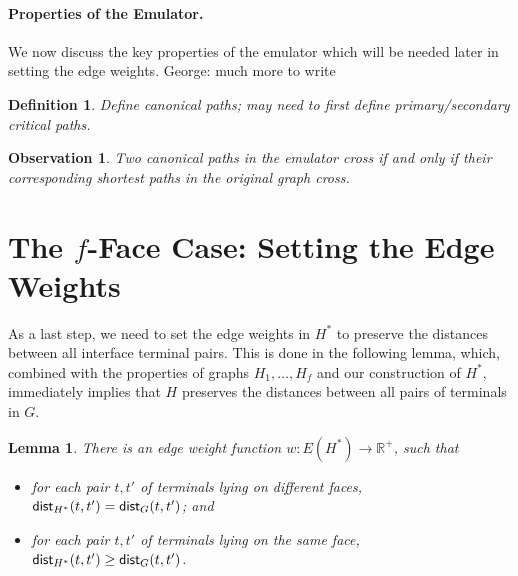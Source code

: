 \documentclass[11pt]{article}
\newcommand{\george}[1]{{\color{green} George: #1}}
\newtheorem{observation}[theorem]{Observation}
\newtheorem{lemma}[theorem]{Lemma}
\newtheorem{definition}[theorem]{Definition}
\newcommand{\dist}{\textnormal{\textsf{dist}}}
\begin{document}
\paragraph{Properties of the Emulator.} We now discuss the key properties of the emulator which will be needed later in setting the edge weights. \george{much more to write}

\begin{definition}
    Define canonical paths; may need to first define primary/secondary critical paths.
\end{definition}

\begin{observation}
    Two canonical paths in the emulator cross if and only if their corresponding shortest paths in the original graph cross. \label{obs:cross}
\end{observation}
\fi

























\section{The $f$-Face Case: Setting the Edge Weights}
\label{sec: edge weight}

As a last step, we need to set the edge weights in $H^*$ to preserve the distances between all interface terminal pairs. This is done in the following lemma, which, combined with the properties of graphs $H_1,\ldots,H_f$ and our construction of $H^*$, immediately implies that $H$ preserves the distances between all pairs of terminals in $G$.

\begin{lemma}
\label{lem: f face weight}
There is an edge weight function $w: E(H^*)\to \mathbb{R^+}$, such that
\begin{itemize}
    \item for each pair $t,t'$ of terminals lying on different faces, $\dist_{H^*}(t,t')= \dist_G(t,t')$; and
    \item for each pair $t,t'$ of terminals lying on the same face, $\dist_{H^*}(t,t')\ge \dist_G(t,t')$.
\end{itemize}
\end{lemma}
\end{document}
